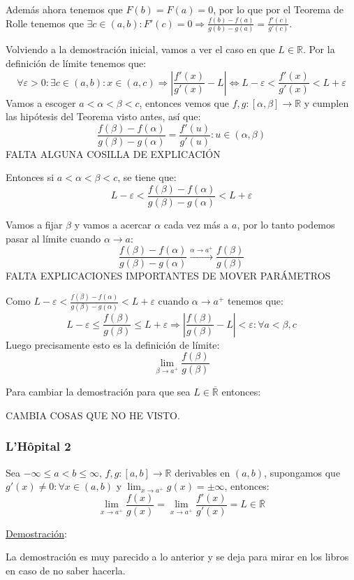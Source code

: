 \documentclass[10pt,a4paper,openright]{book}
\theoremstyle{break}
\begin{document}
Además ahora tenemos que $F(b)=F(a)=0$, por lo que por el Teorema de Rolle tenemos que $\exists c \in (a,b): F'(c)=0\Rightarrow \frac{f(b)-f(a)}{g(b)-g(a)}=\frac{f'(c)}{g'(c)}$.

Volviendo a la demostración inicial, vamos a ver el caso en que $L\in \mathbb R$. Por la definición de límite tenemos que:
$$\forall \varepsilon>0: \exists c\in (a,b): x\in (a,c)\Rightarrow \left|\frac{f'(x)}{g'(x)}-L\right|\Leftrightarrow L-\varepsilon< \frac{f'(x)}{g'(x)}< L+\varepsilon$$
Vamos a escoger $a<\alpha<\beta < c$, entonces vemos que $f,g: [\alpha,\beta]\rightarrow \mathbb R$ y cumplen las hipótesis del Teorema visto antes, así que:
$$\frac{f(\beta)-f(\alpha)}{g(\beta)-g(\alpha)}=\frac{f'(u)}{g'(u)}: u\in (\alpha, \beta)$$
FALTA ALGUNA COSILLA DE EXPLICACIÓN

Entonces si $a<\alpha < \beta < c$, se tiene que:
$$L-\varepsilon< \frac{f(\beta)- f(\alpha)}{g(\beta)-g(\alpha)}<L+\varepsilon$$

Vamos a fijar $\beta$ y vamos a acercar $\alpha $ cada vez más a $a$, por lo tanto podemos pasar al límite cuando $\alpha \rightarrow a$:
$$\frac{f(\beta)-f(\alpha)}{g(\beta)-g(\alpha)}\xrightarrow{\alpha\rightarrow a^+} \frac{f(\beta)}{g(\beta)}$$
FALTA EXPLICACIONES IMPORTANTES DE MOVER PARÁMETROS

Como $L-\varepsilon < \frac{f(\beta)- f(\alpha)}{g(\beta)-g(\alpha)}<L+\varepsilon$ cuando $\alpha \rightarrow a^+$ tenemos que:
$$L-\varepsilon \leq \frac{ f(\beta)}{g(\beta)}\leq L+\varepsilon\Rightarrow \left|\frac{f(\beta)}{g(\beta)}-L\right|<\varepsilon: \forall a<\beta, c$$
Luego precisamente esto es la definición de límite:
$$\lim_{\beta\rightarrow a^+}\frac{f(\beta)}{g(\beta)}$$

Para cambiar la demostración para que sea $L\in \overline{\mathbb R}$ entonces:

CAMBIA COSAS QUE NO HE VISTO.

\subsubsection{L'Hôpital 2}
Sea $-\infty\leq a < b \leq \infty$, $f,g: [a,b]\rightarrow \mathbb R$ derivables en $(a,b)$, supongamos que $g'(x)\neq 0: \forall x\in (a,b)$ y $\lim_{x\rightarrow a^+}g(x)=\pm\infty$, entonces:
$$\lim_{x\rightarrow a^+}\frac{f(x)}{g(x)}=\lim_{x\rightarrow a^+}\frac{f'(x)}{g'(x)}=L\in \overline{\mathbb R}$$

\underline{Demostración}:

La demostración es muy parecido a lo anterior y se deja para mirar en los libros en caso de no saber hacerla.
\end{document}

